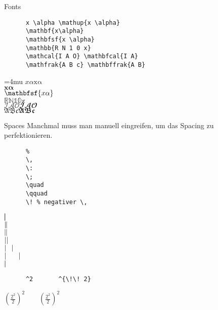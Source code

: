 \begin{frame}[fragile]{
  Fonts
  \hfill{}
}
  \begin{CodeExample}{0.70}
    \begin{lstlisting}
      x \alpha \mathup{x \alpha}
      \mathbf{x\alpha}
      \mathbfsf{x \alpha}
      \mathbb{R N 1 0 x}
      \mathcal{I A O} \mathbfcal{I A}
      \mathfrak{A B c} \mathbffrak{A B}
    \end{lstlisting}
  \CodeResult
    \Umathordordspacing\textstyle=4mu
    $x \alpha \mathup{x \alpha}$ \\
    $\mathbf{x\alpha}$ \\
    $\mathbfsf{x \alpha}$ \\
    $\mathbb{R N 1 0 x}$ \\
    $\mathcal{I A O} \mathbfcal{I A O}$ \\
    $\mathfrak{A B c} \mathbffrak{A B c}$
  \end{CodeExample}
\end{frame}

\begin{frame}[fragile]{Spaces}
  Manchmal muss man manuell eingreifen, um das Spacing zu perfektionieren.
  \begin{CodeExample}{0.48}
    \begin{lstlisting}
      %
      \,
      \:
      \;
      \quad
      \qquad
      \! % negativer \,
    \end{lstlisting}
  \CodeResult
    $|\mspace{-5mu} |$ \\
    $|\mspace{-5mu} \,|$ \\
    $|\mspace{-5mu} \:|$ \\
    $|\mspace{-5mu} \;|$ \\
    $|\mspace{-5mu} \quad|$ \\
    $|\mspace{-5mu} \qquad|$ \\
    $|\mspace{-5mu} \!|$
  \end{CodeExample}
  \begin{CodeExample}{0.48}
    \begin{lstlisting}
      ^2       ^{\!\! 2}

    \end{lstlisting}
  \CodeResult
    $\displaystyle \left( \frac{2^2}{2} \right)^2
    \qquad \left( \frac{2^2}{2} \right)^{\!\! 2}$
  \end{CodeExample}
\end{frame}

